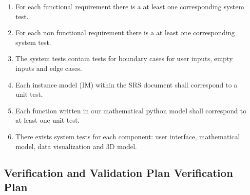 \documentclass[12pt, titlepage]{article}
\begin{document}
\begin{enumerate}
  \item For each functional requirement there is a at least one corresponding system test.
  \item For each non functional requirement there is a at least one corresponding system test.  
  \item The system tests contain tests for boundary cases for user inputs, empty inputs and edge cases. 
  \item Each instance model (IM) within the SRS document shall correspond to a unit test. 
  \item Each function written in our mathematical python model shall correspond to at least one unit test. 
  \item There exists system tests for each component: user interface, mathematical model, data visualization and 3D model. 
\end{enumerate}
\subsection{Verification and Validation Plan Verification Plan}
\end{document}
